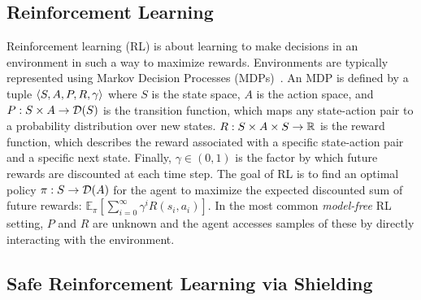 \documentclass[acmsmall,screen,nonacm]{acmart}
\begin{document}
\subsection{Reinforcement Learning}

\newcommand{\RLState}{{S}}
\newcommand{\RLAction}{{A}}

Reinforcement learning (RL) is about learning to make decisions in an environment in such a way to maximize rewards. Environments are typically represented using Markov Decision Processes (MDPs)~\cite{sutton2018reinforcement}. An MDP is defined by a tuple $\tuple{\RLState, \RLAction, P, R, \gamma}$ where $\RLState$ is the state space, $\RLAction$ is the action space, and $P: \RLState \times \RLAction \to \Distrs{\RLState}$ is the transition function, which maps any state-action pair to a probability distribution over new states. $R: \RLState \times \RLAction \times \RLState \to \Reals$ is the reward function, which describes the reward associated with a specific state-action pair and a specific next state. Finally, $\gamma\in (0, 1)$ is the factor by which future rewards are discounted at each time step. The goal of RL is to find an optimal policy $\pi:\RLState \to \Distrs{\RLAction}$ for the agent to maximize the expected discounted sum of future rewards: $\mathbb{E}_\pi\left[\sum_{i=0}^{\infty}\gamma^iR(s_i, a_i)\right]$. In the most common \emph{model-free} RL setting, $P$ and $R$ are unknown and the agent accesses samples of these by directly interacting with the environment.

\subsection{Safe Reinforcement Learning via Shielding}
\label{sec:safe-rl-via-jsc}
\end{document}
